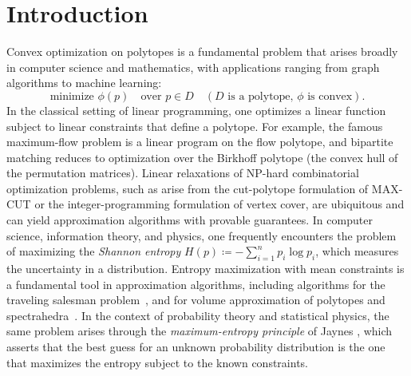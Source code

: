 \documentclass[11pt,letterpaper]{article}
\numberwithin{equation}{section}
\newcommand{\minproblem}[2]{\text{minimize } #1 \quad \text{over } #2}
\begin{document}
\setcounter{tocdepth}{3}
\setlength{\cftbeforesecskip}{0.75em}
\tableofcontents
\clearpage



\section{Introduction}\label{sec:intro}
Convex optimization on polytopes is a fundamental problem that arises broadly in computer science and mathematics, with applications ranging from graph algorithms to machine learning:
\begin{equation}\label{eq:intro-convex-opt}
    \minproblem{\phi(p)}{p \in D} \quad (D \text{ is a polytope}, \, \phi \text{ is convex}).
\end{equation}
In the classical setting of linear programming, one optimizes a linear function subject to linear constraints that define a polytope.
For example, the famous maximum-flow problem is a linear program on the flow polytope, and bipartite matching reduces to optimization over the Birkhoff polytope (the convex hull of the permutation matrices).
Linear relaxations of \textsc{NP}-hard combinatorial optimization problems, such as arise from the cut-polytope formulation of \textsc{MAX-CUT} or the integer-programming formulation of vertex cover, are ubiquitous and can yield approximation algorithms with provable guarantees.
In computer science, information theory, and physics, one frequently encounters the problem of maximizing the \emph{Shannon entropy} $H(p) \coloneqq -\sum_{i=1}^n p_i\log p_i$, which measures the uncertainty in a distribution.
Entropy maximization with mean constraints is a fundamental tool in approximation algorithms, including algorithms for the traveling salesman problem~\cite{AGMGS-10,vishnoi-singh,vishnoi-straszak}, and for volume approximation of polytopes and spectrahedra~\cite{Barvinok-09,Barvinok-Hartigan-10,Barvinok-12,Barvinok-Rudelson-21,Dogan-Leake-Ravichandran-22}.
In the context of probability theory and statistical physics, the same problem arises through the \emph{maximum-entropy principle} of Jaynes \cite{jaynes1957informationi,jaynes1957informationii}, which asserts that the best guess for an unknown probability distribution is the one that maximizes the entropy subject to the known constraints.
\end{document}
